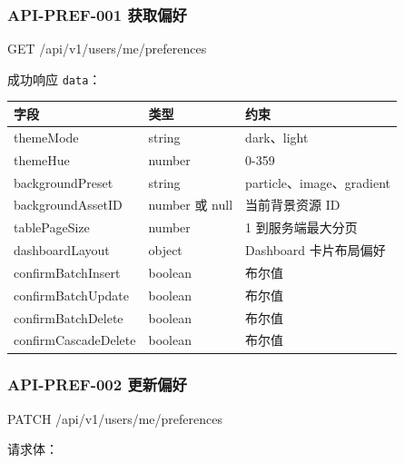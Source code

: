 \documentclass[
  a4paper,
  UTF8]{ctexart}
\newenvironment{Shaded}{}{}
\newcommand{\NormalTok}[1]{#1}
\begin{document}
\hypertarget{api-pref-001-ux83b7ux53d6ux504fux597d}{%
\subsubsection{API-PREF-001
获取偏好}\label{api-pref-001-ux83b7ux53d6ux504fux597d}}

\begin{Shaded}
\begin{Highlighting}[]
\NormalTok{GET /api/v1/users/me/preferences}
\end{Highlighting}
\end{Shaded}

成功响应 \texttt{data}：

\begin{longtable}[]{@{}lll@{}}
\toprule
字段 & 类型 & 约束 \\
\midrule
\endhead
themeMode & string & dark、light \\
themeHue & number & 0-359 \\
backgroundPreset & string & particle、image、gradient \\
backgroundAssetID & number 或 null & 当前背景资源 ID \\
tablePageSize & number & 1 到服务端最大分页 \\
dashboardLayout & object & Dashboard 卡片布局偏好 \\
confirmBatchInsert & boolean & 布尔值 \\
confirmBatchUpdate & boolean & 布尔值 \\
confirmBatchDelete & boolean & 布尔值 \\
confirmCascadeDelete & boolean & 布尔值 \\
\bottomrule
\end{longtable}

\hypertarget{api-pref-002-ux66f4ux65b0ux504fux597d}{%
\subsubsection{API-PREF-002
更新偏好}\label{api-pref-002-ux66f4ux65b0ux504fux597d}}

\begin{Shaded}
\begin{Highlighting}[]
\NormalTok{PATCH /api/v1/users/me/preferences}
\end{Highlighting}
\end{Shaded}

请求体：
\end{document}
